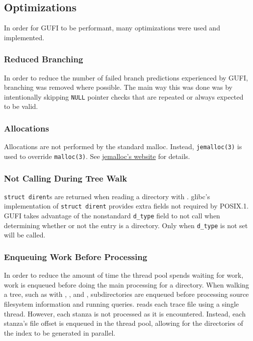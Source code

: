 \subsection{Optimizations}
In order for GUFI to be performant, many optimizations were used and
implemented.

\subsubsection{Reduced Branching}
In order to reduce the number of failed branch predictions experienced
by GUFI, branching was removed where possible. The main way this was
done was by intentionally skipping \texttt{NULL} pointer checks that
are repeated or always expected to be valid.

\subsubsection{Allocations}
Allocations are not performed by the standard malloc. Instead,
\texttt{jemalloc(3)} is used to override \texttt{malloc(3)}. See
\href{https://jemalloc.net/}{jemalloc's website} for details.

\subsubsection{Not Calling \lstat During Tree Walk}
\texttt{struct~dirent}s are returned when reading a directory with
\readdir. glibc's implementation of \texttt{struct~dirent} provides
extra fields not required by POSIX.1. GUFI takes advantage of the
nonstandard \texttt{d\_type} field to not call \lstat when determining
whether or not the entry is a directory. Only when \texttt{d\_type} is
not set will \lstat be called.

\subsubsection{Enqueuing Work Before Processing}
In order to reduce the amount of time the thread pool spends waiting
for work, work is enqueued before doing the main processing for a
directory. When walking a tree, such as with \gufidirindex,
\gufidirtrace, and \gufiquery, subdirectories are enqueued before
processing source filesystem information and running
queries. \gufitraceindex reads each trace file using a single
thread. However, each stanza is not processed as it is
encountered. Instead, each stanza's file offset is enqueued in the
thread pool, allowing for the directories of the index to be generated
in parallel.

